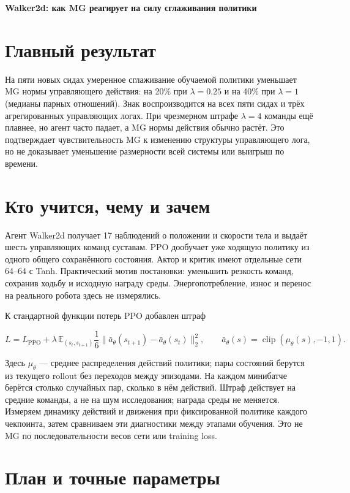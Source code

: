 \documentclass[10pt,a4paper]{article}
\begin{document}
{\Large\bfseries Walker2d: как MG реагирует на силу сглаживания политики}\par\medskip

\section*{Главный результат}

На пяти новых сидах умеренное сглаживание обучаемой политики уменьшает MG нормы управляющего действия: на 20\% при $\lambda=0.25$ и на 40\% при $\lambda=1$ (медианы парных отношений). Знак воспроизводится на всех пяти сидах и трёх агрегированных управляющих логах. При чрезмерном штрафе $\lambda=4$ команды ещё плавнее, но агент часто падает, а MG нормы действия обычно растёт. Это подтверждает чувствительность MG к изменению структуры управляющего лога, но не доказывает уменьшение размерности всей системы или выигрыш по времени.

\section*{Кто учится, чему и зачем}

Агент Walker2d получает 17 наблюдений о положении и скорости тела и выдаёт шесть управляющих команд суставам. PPO дообучает уже ходящую политику из одного общего сохранённого состояния. Актор и критик имеют отдельные сети 64--64 с Tanh. Практический мотив постановки: уменьшить резкость команд, сохранив ходьбу и исходную награду среды. Энергопотребление, износ и перенос на реального робота здесь не измерялись.

К стандартной функции потерь PPO добавлен штраф

\[
L=L_{\mathrm{PPO}}+\lambda\,\mathbb{E}_{(s_t,s_{t+1})}\frac{1}{6}\|\bar a_\theta(s_{t+1})-\bar a_\theta(s_t)\|_2^2,
\qquad \bar a_\theta(s)=\operatorname{clip}(\mu_\theta(s),-1,1).
\]

Здесь $\mu_\theta$ --- среднее распределения действий политики; пары состояний берутся из текущего rollout без переходов между эпизодами. На каждом минибатче берётся столько случайных пар, сколько в нём действий. Штраф действует на средние команды, а не на шум исследования; награда среды не меняется. Измеряем динамику действий и движения при фиксированной политике каждого чекпоинта, затем сравниваем эти диагностики между этапами обучения. Это не MG по последовательности весов сети или training loss.

\section*{План и точные параметры}
\end{document}
